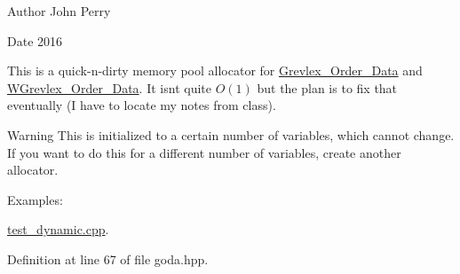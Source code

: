 \begin{DoxyAuthor}{Author}
John Perry 
\end{DoxyAuthor}
\begin{DoxyDate}{Date}
2016
\end{DoxyDate}
This is a quick-\/n-\/dirty memory pool allocator for \hyperlink{group__orderinggroup_class_grevlex___order___data}{Grevlex\+\_\+\+Order\+\_\+\+Data} and \hyperlink{group__orderinggroup_class_w_grevlex___order___data}{W\+Grevlex\+\_\+\+Order\+\_\+\+Data}. It isn\textquotesingle{}t quite $O(1)$ but the plan is to fix that eventually (I have to locate my notes from class). \begin{DoxyWarning}{Warning}
This is initialized to a certain number of variables, which cannot change. If you want to do this for a different number of variables, create another allocator. 
\end{DoxyWarning}
\begin{Desc}
\item[Examples\+: ]\par
\hyperlink{test_dynamic_8cpp-example}{test\+\_\+dynamic.\+cpp}.\end{Desc}


Definition at line 67 of file goda.\+hpp.

